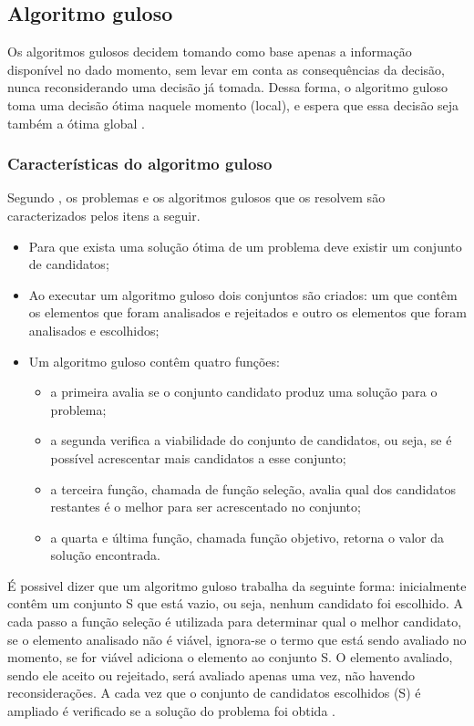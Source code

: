 \subsection{Algoritmo guloso}
Os algoritmos gulosos decidem tomando como base apenas a informação disponível no dado momento, sem levar em conta as consequências da decisão, nunca reconsiderando uma decisão já tomada. Dessa forma, o algoritmo guloso toma uma decisão ótima naquele momento (local), e espera que essa decisão seja também a ótima global \cite{anderson2004}.
\subsubsection{Características do algoritmo guloso}
Segundo \cite{anderson2004}, os problemas e os algoritmos gulosos que os resolvem são caracterizados pelos itens a seguir.
\begin{itemize}
\item Para que exista uma solução ótima de um problema deve existir um conjunto de candidatos;
\item Ao executar um algoritmo guloso dois conjuntos são criados: um que contêm os elementos que foram analisados e rejeitados e outro os elementos que foram analisados e escolhidos;
\item Um algoritmo guloso contêm quatro funções: 
\begin{itemize}
\item a primeira avalia se o conjunto candidato produz uma solução para o problema; 
\item a segunda verifica a viabilidade do conjunto de candidatos, ou seja, se é possível acrescentar mais candidatos a esse conjunto; 
\item a terceira função, chamada de função seleção, avalia qual dos candidatos restantes é o melhor para ser acrescentado no conjunto; 
\item a quarta e última função, chamada função objetivo, retorna o valor da solução encontrada.
\end{itemize} 
\end{itemize}
É possivel dizer que um algoritmo guloso trabalha da seguinte forma: inicialmente contêm um conjunto S que está vazio, ou seja, nenhum candidato foi escolhido. A cada passo a função seleção é utilizada para determinar qual o melhor candidato, se o elemento analisado não é viável, ignora-se o termo que está sendo avaliado no momento, se for viável adiciona o elemento ao conjunto S. O elemento avaliado, sendo ele aceito ou rejeitado, será avaliado apenas uma vez, não havendo reconsiderações. A cada vez que o conjunto de candidatos escolhidos (S) é ampliado é verificado se a solução do problema foi obtida \cite{anderson2004}.  
